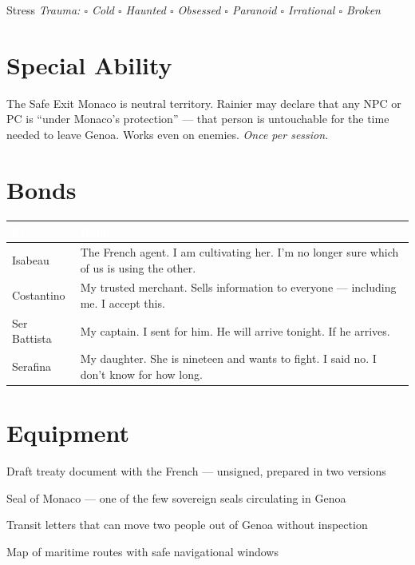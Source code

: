 \medskip
\begin{pgclockbox}{Stress \hfill {}}
\small\textit{Trauma: $\square$ Cold \quad $\square$ Haunted \quad $\square$ Obsessed \quad $\square$ Paranoid \quad $\square$ Irrational \quad $\square$ Broken}
\end{pgclockbox}

\section*{Special Ability}
\begin{grimaldibox}{The Safe Exit}
Monaco is neutral territory. Rainier may declare that any NPC or PC is
``under Monaco's protection'' --- that person is untouchable for the time
needed to leave Genoa. Works even on enemies.
\textit{Once per session.}
\end{grimaldibox}

\section*{Bonds}
\begin{table}[h]\centering\renewcommand{\arraystretch}{1.4}
\begin{tabularx}{\linewidth}{@{}L{2.6cm} X@{}}
\toprule{}
\textcolor{white}{\textbf{PC}} & \textcolor{white}{\textbf{Bond}} \\
\midrule
Isabeau & The French agent. I am cultivating her. I'm no longer sure which of us is using the other. \\
Costantino & My trusted merchant. Sells information to everyone --- including me. I accept this. \\
Ser Battista & My captain. I sent for him. He will arrive tonight. If he arrives. \\
Serafina & My daughter. She is nineteen and wants to fight. I said no. I don't know for how long. \\
\bottomrule
\end{tabularx}
\end{table}

\section*{Equipment}
\begin{goldlist}
\item Draft treaty document with the French --- unsigned, prepared in two versions
\item Seal of Monaco --- one of the few sovereign seals circulating in Genoa
\item Transit letters that can move two people out of Genoa without inspection
\item Map of maritime routes with safe navigational windows
\end{goldlist}

